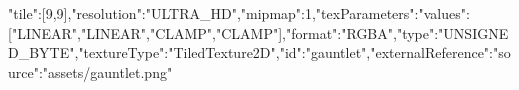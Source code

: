{"tile":[9,9],"resolution":"ULTRA_HD","mipmap":1,"texParameters":{"values":["LINEAR","LINEAR","CLAMP","CLAMP"]},"format":"RGBA","type":"UNSIGNED_BYTE","textureType":"TiledTexture2D","id":"gauntlet","externalReference":{"source":"assets/gauntlet.png"}}